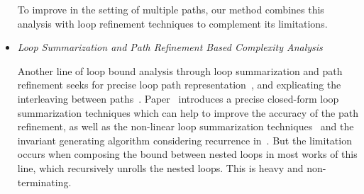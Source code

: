 \begin{itemize}
  To improve in the setting of multiple paths, our method combines this analysis with loop refinement techniques to complement its limitations.
\item
\emph{Loop Summarization and Path Refinement Based Complexity Analysis}

Another line of loop bound analysis through loop summarization and path refinement seeks for precise loop path representation~\cite{ManoliosV06,BalakrishnanSIG09,SharmaDDA11,Flores-MontoyaH14,HumenbergerJK18,CyphertBKR19}, and explicating the interleaving between paths~\cite{GulwaniJK09,ZulegerGSV11}.
Paper~\cite{KincaidBCR19} introduces a precise closed-form loop summarization techniques which can help to improve the accuracy of the path refinement, as well as the non-linear loop summarization techniques~\cite{KincaidCBR18} and the invariant generating algorithm considering recurrence in~\cite{BreckCKR20}. 
But the limitation occurs when composing the bound between nested loops in most works of this line, which recursively unrolls the nested loops. This is heavy and non-terminating.



\end{itemize}
